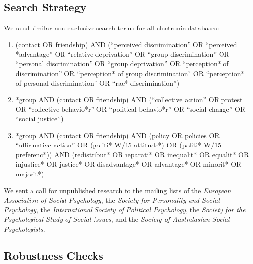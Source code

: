 \documentclass[12pt, letterpaper]{article}
\begin{document}
\hypertarget{search-strategy}{%
\subsection{Search Strategy}\label{search-strategy}}

We used similar non-exclusive search terms for all electronic databases:

\begin{enumerate}
\def\labelenumi{\arabic{enumi}.}
\item
  (contact OR friendship) AND (``perceived discrimination'' OR
  ``perceived *advantage'' OR ``relative deprivation'' OR ``group
  discrimination'' OR ``personal discrimination'' OR ``group
  deprivation'' OR ``perception* of discrimination'' OR ``perception* of
  group discrimination'' OR ``perception* of personal discrimination''
  OR ``rac* discrimination'')
\item
  *group AND (contact OR friendship) AND (``collective action'' OR
  protest OR ``collective behavio*r'' OR ``political behavio*r'' OR
  ``social change'' OR ``social justice'')
\item
  *group AND (contact OR friendship) AND (policy OR policies OR
  ``affirmative action'' OR (politi* W/15 attitude*) OR (politi* W/15
  preferenc*)) AND (redistribut* OR reparati* OR inequalit* OR equalit*
  OR injustice* OR justice* OR disadvantage* OR advantage* OR minorit*
  OR majorit*)
\end{enumerate}

\noindent We sent a call for unpublished research to the mailing lists
of the \emph{European Association of Social Psychology}, the
\emph{Society for Personality and Social Psychology}, the
\emph{International Society of Political Psychology}, the \emph{Society
for the Psychological Study of Social Issues}, and the \emph{Society of
Australasian Social Psychologists}.

\hypertarget{robustness-checks}{%
\subsection{Robustness Checks}\label{robustness-checks}}
\end{document}
